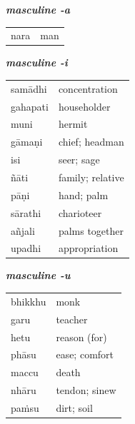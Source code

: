\documentclass[11pt,oneside]{memoir}
\begin{document}
\begin{multicols}{3}
{\centering\textit{\textbf{masculine -a}}\par}

\begin{center}
\begin{tabular}{ll}
nara & man\\
\end{tabular}
\end{center}

\columnbreak
{\centering\textit{\textbf{masculine -i}}\par}

\begin{center}
\begin{tabular}{ll}
samādhi & concentration\\
gahapati & householder\\
muni & hermit\\
gāmaṇi & chief; headman\\
isi & seer; sage\\
ñāti & family; relative\\
pāṇi & hand; palm\\
sārathi & charioteer\\
añjali & palms together\\
upadhi & appropriation\\
\end{tabular}
\end{center}

\columnbreak
{\centering\textit{\textbf{masculine -u}}\par}

\begin{center}
\begin{tabular}{ll}
bhikkhu & monk\\
garu & teacher\\
hetu & reason (for)\\
phāsu & ease; comfort\\
maccu & death\\
nhāru & tendon; sinew\\
paṁsu & dirt; soil\\
\end{tabular}
\end{center}

\end{multicols}

\bigskip
\end{document}
